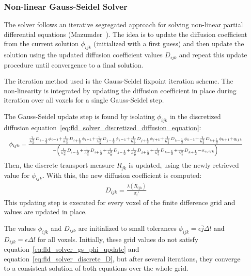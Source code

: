 \subsubsection*{Non-linear Gauss-Seidel Solver}

The solver follows an iterative segregated approach for solving non-linear partial differential equations (Mazumder~\cite{Mazumder2015}). The idea is to update the diffusion coefficient from the current solution $\phi_{ijk}$ (initialized with a first guess) and then update the solution using the updated diffusion coefficient values $D_{ijk}$ and repeat this update procedure until convergence to a final solution.

The iteration method used is the Gauss-Seidel fixpoint iteration scheme. The non-linearity is integrated by updating the diffusion coefficient in place during iteration over all voxels for a single Gauss-Seidel step.

The Gauss-Seidel update step is found by isolating $\phi_{ijk}$ in the discretized diffusion equation~\ref{eq:fld_solver_discretized_diffusion_equation}:
\begin{equation}
\label{eq:fld_solver_gs_phi_update}
\resizebox{1.0\hsize}{!}{$
\phi_{ijk} =
\\
\frac
{
\frac{1}{h_x^2}D_{i-\frac{1}{2}}\phi_{i-1}
+\frac{1}{h_x^2}D_{i+\frac{1}{2}}\phi_{i+1}
+\frac{1}{h_y^2}D_{j-\frac{1}{2}}\phi_{j-1}
+\frac{1}{h_y^2}D_{j+\frac{1}{2}}\phi_{j+1}
+\frac{1}{h_z^2}D_{k-\frac{1}{2}}\phi_{k-1}
+\frac{1}{h_z^2}D_{k+\frac{1}{2}}\phi_{k+1}
+q_{ijk}
}
{
-\left(
\frac{1}{h_x^2}D_{i-\frac{1}{2}}+\frac{1}{h_x^2}D_{i+\frac{1}{2}}
+\frac{1}{h_y^2}D_{j-\frac{1}{2}}+\frac{1}{h_y^2}D_{j+\frac{1}{2}}
+\frac{1}{h_z^2}D_{k-\frac{1}{2}}+\frac{1}{h_z^2}D_{k+\frac{1}{2}}
-\sigma_{a, ijk}
\right)
}
$}
\end{equation}
Then, the discrete transport measure $R_{jk}$ is updated, using the newly retrieved value for $\phi_{ijk}$. With this, the new diffusion coefficient is computed:
\begin{align}
D_{ijk} = \frac{\lambda\left(R_{ijk}\right)}{\sigma_t'}
\label{eq:fld_solver_discrete_D}
\end{align}
This updating step is executed for every voxel of the finite difference grid and values are updated in place.

The values $\phi_{ijk}$ and $D_{ijk}$ are initialized to small tolerances $\phi_{ijk} = \epsilon \bar{j}\Delta l$ and $D_{ijk} = \epsilon \Delta l$ for all voxels. Initially, these grid values do not satisfy equation~\ref{eq:fld_solver_gs_phi_update} and equation~\ref{eq:fld_solver_discrete_D}, but after several iterations, they converge to a consistent solution of both equations over the whole grid. 

